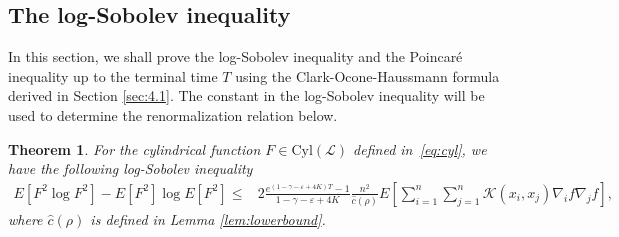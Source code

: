 \documentclass[11pt]{article}
\numberwithin{equation}{section}%
\numberwithin{figure}{section}%
\newtheorem{theorem}{Theorem}[section]
\theoremstyle{remark}
\begin{document}
	\subsection{The log-Sobolev inequality}\label{sec:4.2}
	In this section, we shall prove the log-Sobolev inequality and the Poincar\'e inequality up to the terminal time $T$ using the Clark-Ocone-Haussmann formula derived in Section \ref{sec:4.1}. The constant in the log-Sobolev inequality will be used to determine the renormalization relation below.
	\begin{theorem}\label{thm:logso}
		For the cylindrical function $F\in\text{Cyl}(\mathcal{L})$  defined in~\eqref{eq:cyl}, we have the following log-Sobolev inequality
		\begin{align}\label{eq:Logsob}
			E[F^{2}\log F^{2}]-E[F^{2}]\log E[F^{2}]
			\leq&2\frac{e^{(1-\gamma-\varepsilon+4K)T}-1}{1-\gamma-\varepsilon+4K}\frac{n^{2}}{\hat{c}(\rho)}E\left[\sum_{i=1}^{n}\sum_{j=1}^{n}\mathcal{K}(x_{i},x_{j})\nabla_{i}f\nabla_{j}f\right],
		\end{align}
where $\hat{c}(\rho)$ is defined in Lemma \ref{lem:lowerbound}.
	\end{theorem}
\end{document}
